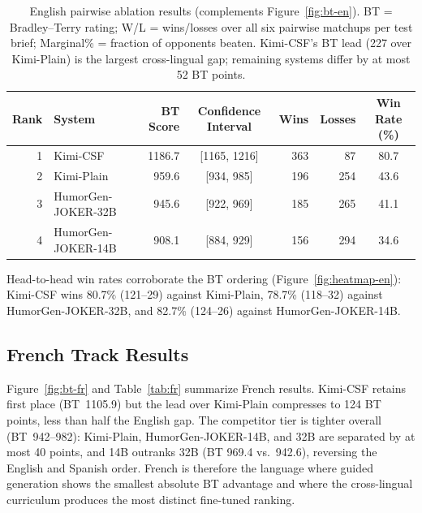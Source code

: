 \documentclass[]{ceurart}
\begin{document}
\begin{table}[t]
  \caption{English pairwise ablation results (complements Figure~\ref{fig:bt-en}).
    BT = Bradley--Terry rating; W/L = wins/losses over all six pairwise
    matchups per test brief; Marginal\% = fraction of opponents beaten.
    Kimi-CSF's BT lead (227 over Kimi-Plain) is the largest cross-lingual gap;
    remaining systems differ by at most 52 BT points.}
  \label{tab:en}
  \small
  \begin{tabular}{rlrcrrc}
    \toprule
    Rank & System & BT Score & Confidence Interval & Wins & Losses & Win Rate (\%) \\
    \midrule
    1 & Kimi-CSF            & 1186.7 & [1165, 1216] & 363 &  87 & 80.7 \\
    2 & Kimi-Plain          &  959.6 & [934, 985] & 196 & 254 & 43.6 \\
    3 & HumorGen-JOKER-32B  &  945.6 & [922, 969] & 185 & 265 & 41.1 \\
    4 & HumorGen-JOKER-14B  &  908.1 & [884, 929] & 156 & 294 & 34.6 \\
    \bottomrule
  \end{tabular}
\end{table}
Head-to-head win rates corroborate the BT ordering
(Figure~\ref{fig:heatmap-en}): Kimi-CSF wins 80.7\% (121--29) against
Kimi-Plain, 78.7\% (118--32) against HumorGen-JOKER-32B, and 82.7\%
(124--26) against HumorGen-JOKER-14B.


\subsection{French Track Results}
\label{sec:fr}

Figure~\ref{fig:bt-fr} and Table~\ref{tab:fr} summarize French results.
Kimi-CSF retains first place (BT~1105.9) but the lead over Kimi-Plain
compresses to 124 BT points, less than half the English gap.
The competitor tier is tighter overall (BT~942--982): Kimi-Plain,
HumorGen-JOKER-14B, and 32B are separated by at most 40 points, and 14B
outranks 32B (BT 969.4 vs.\ 942.6), reversing the English and Spanish order.
French is therefore the language where guided generation shows the smallest
absolute BT advantage and where the cross-lingual curriculum produces the
most distinct fine-tuned ranking.
\end{document}
